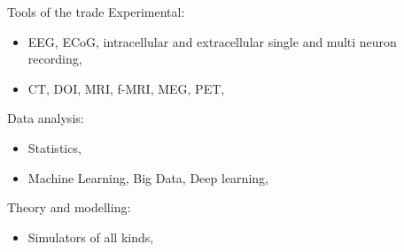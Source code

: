 \begin{frame}[c]{Tools of the trade}
	\textcolor{FedoraBlue}{Experimental:}
	\begin{itemize}
		\item EEG, ECoG, intracellular and extracellular single and multi neuron recording,
		\item CT, DOI, MRI, f-MRI, MEG, PET,
	\end{itemize}
	\textcolor{FriendsMagenta}{Data analysis:}
	\begin{itemize}
		\item Statistics,
		\item Machine Learning, Big Data, Deep learning,
	\end{itemize}
	\textcolor{FeaturesOrange}{Theory} and \textcolor{FirstGreen}{modelling:}
	\begin{itemize}
		\item Simulators of all kinds, 
	\end{itemize}
\end{frame}


